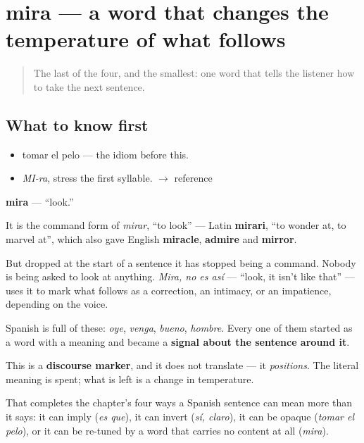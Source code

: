 \section[mira]{mira — a word that changes the temperature of what follows}

\label{lesson:ES-C272-mira}



\begin{quote}
The last of the four, and the smallest: one word that tells the listener how to take the next sentence.
\end{quote}

\subsection*{What to know first}
\begin{itemize}
\raggedright
  \item tomar el pelo — the idiom before this.
\end{itemize}

\begin{sounds}
\begin{itemize}
\raggedright
  \item \emph{MI-ra}, stress the first syllable. $\to$ reference
\end{itemize}
\end{sounds}

\begin{cousinweb}
\textbf{mira} — \textquotedblleft{}look.\textquotedblright{}

It is the command form of \emph{mirar}, \textquotedblleft{}to look\textquotedblright{} — Latin \textbf{mirari}, \textquotedblleft{}to wonder at, to marvel at\textquotedblright{}, which also gave English \textbf{miracle}, \textbf{admire} and \textbf{mirror}.

But dropped at the start of a sentence it has stopped being a command. Nobody is being asked to look at anything. \emph{Mira, no es así} — \textquotedblleft{}look, it isn't like that\textquotedblright{} — uses it to mark what follows as a correction, an intimacy, or an impatience, depending on the voice.

Spanish is full of these: \emph{oye}, \emph{venga}, \emph{bueno}, \emph{hombre}. Every one of them started as a word with a meaning and became a \textbf{signal about the sentence around it}.
\end{cousinweb}

\begin{grammarlens}[title={What you've built}]
This is a \textbf{discourse marker}, and it does not translate — it \emph{positions}. The literal meaning is spent; what is left is a change in temperature.

That completes the chapter's four ways a Spanish sentence can mean more than it says: it can imply (\emph{es que}), it can invert (\emph{sí, claro}), it can be opaque (\emph{tomar el pelo}), or it can be re-tuned by a word that carries no content at all (\emph{mira}).
\end{grammarlens}

